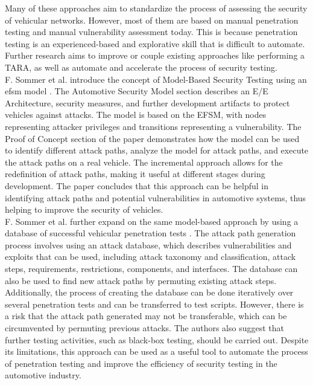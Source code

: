Many of these approaches aim to standardize the process of assessing the security of vehicular networks. However, most of them are based on manual penetration testing and manual vulnerability assessment today. 
This is because penetration testing is an experienced-based and explorative skill that is difficult to automate. 
Further research aims to improve or couple existing approaches like performing a TARA, as well as automate and accelerate the process of security testing.\\

F. Sommer et al. introduce the concept of Model-Based Security Testing using an \gls{efsm} model \cite{model_based_testing}.
The Automotive Security Model section describes an E/E Architecture, security measures, and further development artifacts to protect vehicles against attacks.
The model is based on the EFSM, with nodes representing attacker privileges and transitions representing a vulnerability.
The Proof of Concept section of the paper demonstrates how the model can be used to identify different \gls{attack path}s, analyze the model for attack paths, and execute the attack paths on a real vehicle. 
The incremental approach allows for the redefinition of attack paths, making it useful at different stages during development. 
The paper concludes that this approach can be helpful in identifying attack paths and potential vulnerabilities in automotive systems, thus helping to improve the security of vehicles.\\

F. Sommer et al. further expand on the same model-based approach by using a database of successful vehicular penetration tests \cite{attack_database}.
The attack path generation process involves using an attack database, which describes vulnerabilities and exploits that can be used, including attack taxonomy and classification, attack steps, requirements, restrictions, components, and interfaces. 
The database can also be used to find new attack paths by permuting existing attack steps. 
Additionally, the process of creating the database can be done iteratively over several penetration tests and can be transferred to test scripts. 
However, there is a risk that the attack path generated may not be transferable, which can be circumvented by permuting previous attacks. 
The authors also suggest that further testing activities, such as black-box testing, should be carried out. 
Despite its limitations, this approach can be used as a useful tool to automate the process of penetration testing and improve the efficiency of security testing in the automotive industry.\\


